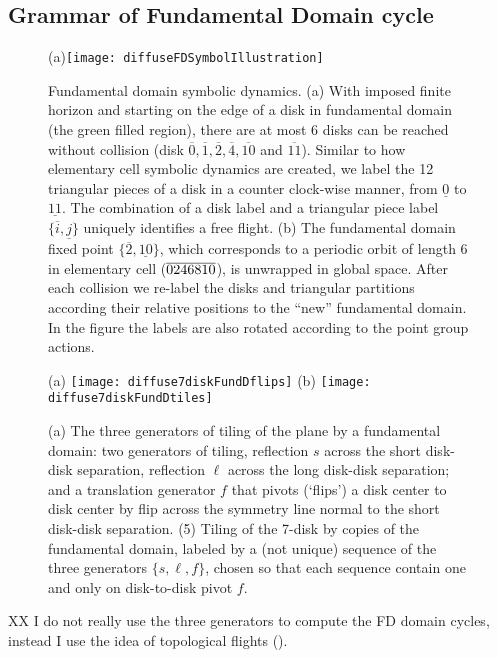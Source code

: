 \documentclass[aps,pre,showpacs,preprint,groupedaddress,floatfix]{revtex4-1}
\begin{document}
\subsection{Grammar of Fundamental Domain cycle}
\begin{figure}[tbp]
(a)\texttt{[image: diffuseFDSymbolIllustration]}

\caption{\label{fig-fdflights} Fundamental domain symbolic dynamics. (a) With imposed finite horizon and starting on the edge of a disk in fundamental domain (the green filled region), there are at most 6 disks can be reached without collision (disk $\overline{0},\overline{1},\overline{2},\overline{4},\overline{10}$ and $\overline{11}$). Similar to how elementary cell symbolic dynamics are created, we label the 12 triangular pieces of a disk in a counter clock-wise manner, from $\underline{0}$ to $\underline{11}$. The combination of a disk label and a triangular piece label $\{\overline{i},\underline{j}\}$ uniquely identifies a free flight. (b) The fundamental domain fixed point $\{\overline{2},\underline{10}\}$, which corresponds to a periodic orbit of length 6 in elementary cell (${\overline{0246810}}$), is unwrapped in global space. After each collision we re-label the disks and triangular partitions according their relative positions to the ``new'' fundamental domain. In the figure the labels are also rotated according to the point group actions.}
\end{figure}

\begin{figure}
\begin{center}
(a) \texttt{[image: diffuse7diskFundDflips]}
(b) \texttt{[image: diffuse7diskFundDtiles]}
\end{center}
\caption{\label{fig-7diskFundDflips} (a) The three generators of tiling of the plane by a fundamental domain: two generators of  tiling, reflection $s$ across the short disk-disk separation, reflection  $\ell$  across the long disk-disk separation; and a translation generator $f$ that pivots (`flips') a disk center to disk center by flip across the symmetry line normal to the short disk-disk separation. (5) Tiling of the 7-disk by copies of the fundamental domain, labeled by a (not unique) sequence of the three generators $\{s,\ell,f\}$, chosen so that each sequence contain one and only on disk-to-disk pivot $f$. }
\end{figure}
XX I do not really use the three generators to compute the FD domain cycles, instead I use the idea of topological flights ().
\end{document}
